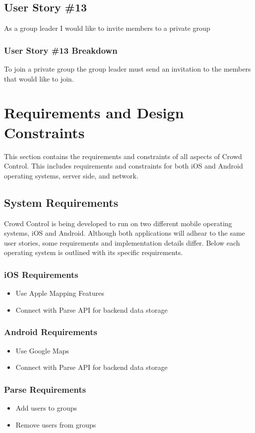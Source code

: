 \subsection{User Story \#13}
As a group leader I would like to invite members to a private group
\subsubsection{User Story \#13 Breakdown}
To join a private group the group leader must send an invitation to the members that would like to join. 

\section{Requirements and Design Constraints}
This section contains the requirements and constraints of all aspects of Crowd Control.  This includes requirements and constraints for both iOS and Android operating systems, server side, and network.


\subsection{System Requirements}

Crowd Control is being developed to run on two different mobile operating systems, iOS and Android.  Although both applications will adhear to the same user stories, some requirements and implementation details differ.  Below each operating system is outlined with its specific requirements.

\subsubsection{iOS Requirements}
\begin{itemize}
\item{Use Apple Mapping Features}
\item{Connect with Parse API for backend data storage}
\end{itemize}
\subsubsection{Android Requirements}
\begin{itemize}
\item{Use Google Maps}
\item{Connect with Parse API for backend data storage}
\end{itemize}
\subsubsection{Parse Requirements}
\begin{itemize}
\item{Add users to groups}
\item{Remove users from groups}
\end{itemize}

